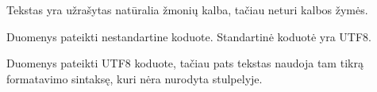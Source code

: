 \documentclass[letterpaper,10pt,lithuanian]{sphinxmanual}
\begin{document}
\begin{fulllineitems}
\begin{sphinxShadowBox}
\begin{description}
\sphinxAtStartPar
Tekstas yra užrašytas natūralia žmonių kalba, tačiau neturi kalbos
žymės.

\sphinxAtStartPar
Duomenys pateikti nestandartine koduote. Standartinė koduotė yra
UTF\sphinxhyphen{}8.

\sphinxAtStartPar
Duomenys pateikti UTF\sphinxhyphen{}8 koduote, tačiau pats tekstas naudoja tam
tikrą formatavimo sintaksę, kuri nėra nurodyta {\hyperref[\detokenize{dimensijos:property.ref}]{}}
stulpelyje.

\end{description}
\end{sphinxShadowBox}

\end{fulllineitems}

\end{document}
